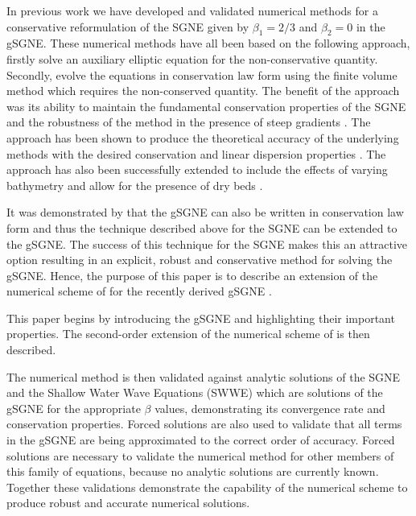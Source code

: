 \documentclass[10pt]{elsarticle}
\begin{document}

In previous work we have developed and validated numerical methods for a conservative reformulation of the SGNE \cite{Zoppou-2014,Zoppou-etal-2016,Zoppou-etal-2017,Pitt-2019} given by $\beta_1 = 2/3$ and $\beta_2 =0$ in the gSGNE. These numerical methods have all been based on the following approach, firstly solve an auxiliary elliptic equation for the non-conservative quantity. Secondly, evolve the equations in conservation law form using the finite volume method which requires the non-conserved quantity. The benefit of the approach was its ability to maintain the fundamental conservation properties of the SGNE \cite{Pitt-2019} and the robustness of the method in the presence of steep gradients \cite{Pitt-2018-61}. The approach has been shown to produce the theoretical accuracy of the underlying methods \cite{Zoppou-etal-2017,Pitt-2019} with the desired conservation and linear dispersion properties \cite{Pitt-2019}. The approach has also been successfully extended to include the effects of varying bathymetry and allow for the presence of dry beds \cite{Pitt-2019}.  

It was demonstrated by \citet{Clamond-Dutykh-2018-237} that the gSGNE can also be written in conservation law form and thus the technique described above for the SGNE can be extended to the gSGNE. The success of this technique for the SGNE makes this an attractive option resulting in an explicit, robust and conservative method for solving the gSGNE. Hence, the purpose of this paper is to describe an extension of the numerical scheme of \citet{Zoppou-etal-2017} for the recently derived gSGNE \cite{Clamond-Dutykh-2018-237}. 

This paper begins by introducing the gSGNE and highlighting their important properties. The second-order extension of the numerical scheme of \citet{Zoppou-etal-2017} is then described. 

The numerical method is then validated against analytic solutions of the SGNE and the Shallow Water Wave Equations (SWWE) which are solutions of the gSGNE for the appropriate $\beta$ values, demonstrating its convergence rate and conservation properties. Forced solutions are also used to validate that all terms in the gSGNE are being approximated to the correct order of accuracy. Forced solutions are necessary to validate the numerical method for other members of this family of equations, because no analytic solutions are currently known. Together these validations demonstrate the capability of the numerical scheme to produce robust and accurate numerical solutions. 
\end{document}
